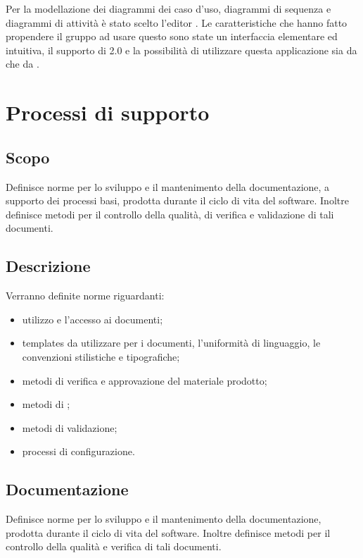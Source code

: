 \documentclass[12pt,a4paper]{article}
\begin{document}
Per la modellazione dei diagrammi dei caso d’uso, diagrammi di sequenza e diagrammi di attività è stato scelto l’editor . Le caratteristiche che hanno fatto propendere il gruppo ad usare questo  sono state un interfaccia elementare ed intuitiva, il supporto di 2.0 e la possibilità di utilizzare questa applicazione sia da  che da .

\newpage

\section{Processi di supporto}

\subsection{Scopo}
Definisce norme per lo sviluppo e il mantenimento della documentazione, a supporto dei processi basi, prodotta durante il ciclo di vita del software. Inoltre definisce metodi per il controllo della qualità, di verifica e validazione di tali documenti.

\subsection{Descrizione}
Verranno definite norme riguardanti:
\begin{itemize}
	\item utilizzo e l'accesso ai documenti;
	\item templates da utilizzare per i documenti, l'uniformità di linguaggio, le convenzioni stilistiche e tipografiche;
	\item metodi di verifica e approvazione del materiale prodotto;
	\item metodi di ;
	\item metodi di validazione;
	\item processi di configurazione.
\end{itemize}

\subsection{Documentazione}\label{Documentazione}
Definisce norme per lo sviluppo e il mantenimento della documentazione, prodotta durante il ciclo di vita del software. Inoltre definisce metodi per il controllo della qualità e verifica di tali documenti.
\end{document}
